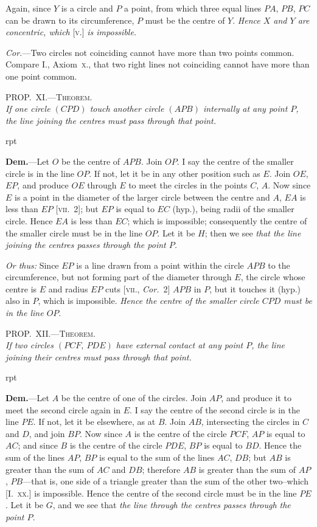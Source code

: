 \documentclass[oneside]{book}
\newcommand\myprop[2]{
\bigskip\Needspace*{4\baselineskip}\begin{center}\textsc{#1}\\\medskip\emph{#2}\par\end{center}
}
\newcommand\imgflow[3]{
\setcounter{wrapwidth}{#1}
\begin{wrapfigure}[#2]{r}{\value{wrapwidth}pt}
\begin{center}
\vspace{-0.3in}
\end{center}
\end{wrapfigure}
}
\begin{document}
Again, since $Y$ is a circle and
$P$ a point, from which three equal
lines $PA$, $PB$, $PC$ can be drawn to its circumference,
$P$ must be the centre of $Y$. \emph{Hence $X$ and $Y$ are concentric,
which} [\textsc{v.}] \emph{is impossible.}

\emph{Cor.}---Two circles not coinciding cannot have more
than two points common. Compare I., Axiom~\textsc{x}., that
two right lines not coinciding cannot have more than
one point common.


\myprop{PROP\@.~XI\@.---Theorem.}{If one circle $(CPD)$ touch another circle $(APB)$ internally
at any point $P$, the line joining the centres must pass through that point.}

\imgflow{112}{10}{f114}

\textbf{Dem.}---Let $O$ be the centre of $APB$. Join $OP$. I
say the centre of the smaller
circle is in the line $OP$. If not,
let it be in any other position such
as $E$. Join $OE$, $EP$, and produce
$OE$ through $E$ to meet the circles
in the points $C$, $A$. Now since $E$
is a point in the diameter of the
larger circle between the centre
and $A$, $EA$ is less than $EP$
[\textsc{vii.}~2]; but $EP$ is equal to $EC$
(hyp.), being radii of the smaller circle. Hence $EA$
is less than $EC$; which is impossible; consequently the
centre of the smaller circle must be in the line $OP$.
Let it be $H$; then we see \textit{that the line joining the centres
passes through the point $P$.}

\textit{Or thus:} Since $EP$ is a line drawn from a point
within the circle $APB$ to the circumference, but not
forming part of the diameter through $E$, the circle
whose centre is $E$ and radius $EP$ cuts [\textsc{vii.}, \textit{Cor.}~2]
$APB$ in $P$, but it touches it (hyp.) also in $P$, which is
impossible. \textit{Hence the centre of the smaller circle $CPD$
must be in the line $OP$}.

\myprop{PROP\@.~XII\@.---Theorem.}{If two circles $(PCF,\ PDE)$ have external contact at any
point $P$, the line joining their centres must pass through
that point.}

\imgflow{150}{7}{f115}

\textbf{Dem.}---Let $A$ be the centre of one of the circles.
Join $AP$, and produce it to meet the second circle again
in $E$. I say the centre of the second circle is in the
line $PE$. If not, let it be elsewhere, as at $B$. Join
$AB$, intersecting the circles
in $C$ and $D$, and join $BP$.
Now since $A$ is the centre
of the circle $PCF$, $AP$ is
equal to $AC$; and since $B$
is the centre of the circle
$PDE$, $BP$ is equal to $BD$.
Hence the sum of the lines $AP$, $BP$ is equal to the
sum of the lines $AC$, $DB$; but $AB$ is greater than the
sum of $AC$ and $DB$; therefore $AB$ is greater than the
sum of $AP$, $PB$---that is, one side of a triangle greater
than the sum of the other two--which [I.~\textsc{xx.}] is impossible.
Hence the centre of the second circle must be
in the line $PE$. Let it be $G$, and we see that \textit{the line
through the centres passes through the point $P$.}
\end{document}
